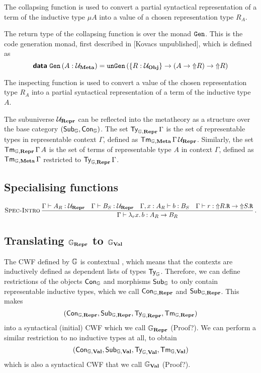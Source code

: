 The collapsing function is used to convert a partial syntactical representation
of a term of the inductive type $\mu A$ into a value of a chosen representation
type $R_A$.

The return type of the collapsing function is over the monad $\Gen$. This is
the code generation monad, first described in [Kovacs unpublished], which is
defined as
\[
  \data{Gen} \, (A : \Um) = \defin{unGen} \, (\{ R : \Uv \} \to (A \to \lift R) \to \lift R)
\]

The inspecting function is used to convert a value of the chosen representation
type $R_A$ into a partial syntactical representation of a term of the inductive
type $A$.

The subuniverse $\Ur$ can be reflected into the metatheory as a structure over
the base category $(\Sub_{\catG}, \Con_{\catG})$. The set
$\Ty_{\catG,\mR}\,\Gamma$ is the set of representable types in representable
context $\Gamma$, defined as $\Tm_{\catG,\mM}\,\Gamma\,\Ur$. Similarly, the set
$\Tm_{\catG,\mR}\,\Gamma\,A$ is the set of terms of representable type $A$ in
context $\Gamma$, defined as $\Tm_{\catG,\mM}\,\Gamma$ restricted to
$\Ty_{\catG,\mR}\,\Gamma$.

\subsection{Specialising functions}

\[
  \infrule[Spec-Intro]{\Gamma \vdash A_R : \Ur \quad \Gamma \vdash B_S : \Ur \quad \Gamma, x : A_R \vdash b : B_S \quad \Gamma \vdash r : \lift{R.\defin R} \to \lift{S.\defin R}}
  {\Gamma \vdash \lambda_r x . \, b : A_R \to B_R} \,.
\]

\subsection{Translating $\catG_\mR$ to $\catG_\mV$}

The CWF defined by $\catG$ is contextual \cite{Castellan2019-sh}, which means
that the contexts are inductively defined as dependent lists of types
$\Ty_\cat{G}$. Therefore, we can define restrictions of the objects
$\Con_{\catG}$ and morphisms $\Sub_{\catG}$ to only contain representable
inductive types, which we call $\Con_{\catG,\mR}$ and $\Sub_{\catG,\mR}$. This
makes
\[
  (\Con_{\catG, \mR}, \Sub_{\catG, \mR}, \Ty_{\catG, \mR}, \Tm_{\catG, \mR})
\]
into a syntactical (initial) CWF which we call $\catG_\mR$ (Proof?). We can
perform a similar restriction to no inductive types at all, to obtain
\[
  (\Con_{\catG, \mV}, \Sub_{\catG, \mV}, \Ty_{\catG, \mV}, \Tm_{\catG, \mV})
\]
which is also a syntactical CWF that we call $\catG_\mV$ (Proof?).

